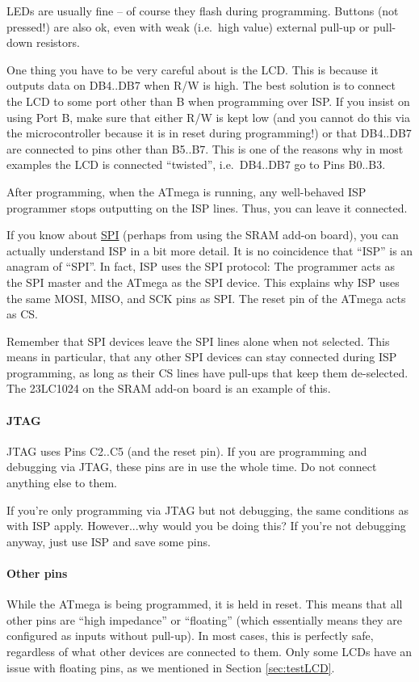 \documentclass{article}
\newenvironment{note}{\begin{tcolorbox}[colback=blue!5!white,colframe=blue!75!black,title=\textbf{Note}]}{\end{tcolorbox}}
\begin{document}
LEDs are usually fine -- of course they flash during programming. Buttons (not pressed!) are also ok, even with weak (i.e.\ high \textOmega{} value) external pull-up or pull-down resistors. 

One thing you have to be very careful about is the LCD. This is because it outputs data on DB4..DB7 when R/W is high. The best solution is to connect the LCD to some port other than B when programming over ISP. 
If you insist on using Port B, make sure that either R/W is kept low (and you cannot do this via the microcontroller because it is in reset during programming!) or that DB4..DB7 are connected to pins other than B5..B7. This is one of the reasons why in most examples the LCD is connected ``twisted'', i.e.\ DB4..DB7 go to Pins B0..B3. 

After programming, when the ATmega is running, any well-behaved ISP programmer stops outputting on the ISP lines. Thus, you can leave it connected. 

\begin{note}
If you know about \href{https://en.wikipedia.org/wiki/Serial_Peripheral_Interface}{SPI} (perhaps from using the SRAM add-on board), you can actually understand ISP in a bit more detail. It is no coincidence that ``ISP'' is an anagram of ``SPI''. In fact, ISP uses the SPI protocol: The programmer acts as the SPI master and the ATmega as the SPI device. This explains why ISP uses the same MOSI, MISO, and SCK pins as SPI. The reset pin of the ATmega acts as CS. 

Remember that SPI devices leave the SPI lines alone when not selected. This means in particular, that any other SPI devices can stay connected during ISP programming, as long as their CS lines have pull-ups that keep them de-selected. The 23LC1024 on the SRAM add-on board is an example of this. 
\end{note}

\paragraph{JTAG} JTAG uses Pins C2..C5 (and the reset pin). If you are programming and debugging via JTAG, these pins are in use the whole time. Do not connect anything else to them. 

If you're only programming via JTAG but not debugging, the same conditions as with ISP apply. However...why would you be doing this? If you're not debugging anyway, just use ISP and save some pins. 

\paragraph{Other pins} While the ATmega is being programmed, it is held in reset. This means that all other pins are ``high impedance'' or ``floating'' (which essentially means they are configured as inputs without pull-up). In most cases, this is perfectly safe, regardless of what other devices are connected to them. Only some LCDs have an issue with floating pins, as we mentioned in Section \ref{sec:testLCD}. 
\end{document}
